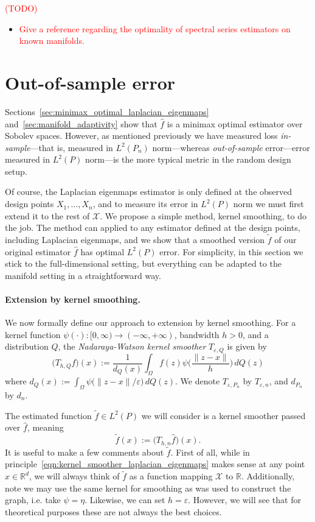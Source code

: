 \documentclass{article}
\newcommand{\Reals}{\mathbb{R}}
\newcommand{\1}{\mathbf{1}}
\newcommand{\Rd}{\Reals^d}
\newcommand{\Xset}{\mathcal{X}}
\newcommand{\Leb}{L}
\newcommand{\mc}[1]{\mathcal{#1}}
\newcommand{\wt}[1]{\widetilde{#1}}
\newcommand{\wh}[1]{\widehat{#1}}
\theoremstyle{alden}
\theoremstyle{aldenthm}
\theoremstyle{definition}
\theoremstyle{remark}
\begin{document}
\textcolor{red}{(TODO)}
\begin{itemize}
	\item \textcolor{red}{Give a reference regarding the optimality of spectral series estimators on known manifolds.}
\end{itemize}

\section{Out-of-sample error}
\label{sec:out_of_sample}
Sections~\ref{sec:minimax_optimal_laplacian_eigenmaps} and~\ref{sec:manifold_adaptivity} show that $\wh{f}$ is a minimax optimal estimator over Sobolev spaces. However, as mentioned previously we have measured loss \emph{in-sample}---that is, measured in $\Leb^2(P_n)$ norm---whereas \emph{out-of-sample} error---error measured in $L^2(P)$ norm---is the more typical metric in the random design setup.

Of course, the Laplacian eigenmaps estimator is only defined at the observed design points $X_1,\ldots,X_n$, and to measure its error in $L^2(P)$ norm we must first extend it to the rest of $\Xset$. We propose a simple method, kernel smoothing, to do the job. The method can applied to any estimator defined at the design points, including Laplacian eigenmaps, and we show that a smoothed version $\wt{f}$ of our original estimator $\wh{f}$ has optimal $L^2(P)$ error. For simplicity, in this section we stick to the full-dimensional setting, but everything can be adapted to the manifold setting in a straightforward way.

\paragraph{Extension by kernel smoothing.}
We now formally define our approach to extension by kernel smoothing. For a kernel function $\psi(\cdot): [0,\infty) \to (-\infty,+\infty)$, bandwidth $h > 0$, and a distribution $Q$, the \emph{Nadaraya-Watson kernel smoother} $T_{\varepsilon,Q}$ is given by
\begin{equation*}
\bigl(T_{h,Q}f)(x) := \frac{1}{d_Q(x)} \int_{\Omega} f(z)\psi\biggl(\frac{\|z - x\|}{h}\biggr) \,dQ(z)
\end{equation*}
where $d_Q(x) := \int_{\Omega} \psi\bigl(\|z - x\|/\varepsilon\bigr) \,dQ(z)$. We denote $T_{\varepsilon,P_n}$ by $T_{\varepsilon,n}$, and $d_{P_n}$ by $d_n$. 

The estimated function $\wt{f} \in L^2(P)$ we will consider is a kernel smoother passed over $\wh{f}$, meaning
\begin{equation}
\label{eqn:kernel_smoother_laplacian_eigenmaps}
\wt{f}(x) := \bigl(T_{h,n}\wh{f}\bigr)(x).
\end{equation}
It is useful to make a few comments about $\wt{f}$. First of all, while in principle~\eqref{eqn:kernel_smoother_laplacian_eigenmaps} makes sense at any point $x \in \Rd$, we will always think of $\wt{f}$ as a function mapping $\mc{X}$ to $\Reals$. Additionally, note we may use the same kernel for smoothing as was used to construct the graph, i.e. take $\psi = \eta$. Likewise, we can set $h = \varepsilon$. However, we will see that for theoretical purposes these are not always the best choices. 
\end{document}
